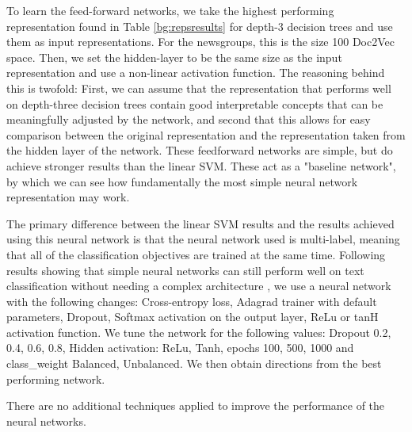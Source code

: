 To learn the feed-forward networks, we take the highest performing representation found in Table \ref{bg:repsresults} for depth-3 decision trees and use them as input representations.  For the newsgroups, this is the size 100 Doc2Vec space. Then, we set the hidden-layer to be the same size as the input representation and use a non-linear activation function.  The reasoning behind this is twofold: First, we can assume that the representation that performs well on depth-three decision trees contain good interpretable concepts that can be meaningfully adjusted by the network, and second that this allows for easy comparison between the original representation and the representation taken from the hidden layer of the network. These feedforward networks are simple, but do achieve stronger results than the linear SVM. These act as a "baseline network", by which we can see how fundamentally the most simple neural network representation may work. 

The primary difference between the linear SVM results and the results achieved using this neural network is that the neural network used is multi-label, meaning that all of the classification objectives are trained at the same time. Following results showing that simple neural networks can still perform well on text classification without needing a complex architecture  \cite{Lakhotia2018} \cite{Nam2014}, we use a neural network with the following changes: Cross-entropy loss, Adagrad trainer with default parameters, Dropout, Softmax activation on the output layer, ReLu or tanH activation function. We tune the network for the following values: Dropout {0.2, 0.4, 0.6, 0.8}, Hidden activation: {ReLu, Tanh}, epochs {100, 500, 1000} and class_weight {Balanced, Unbalanced}. We then obtain directions from the best performing network.


There are no additional techniques applied to improve the performance of the neural networks.